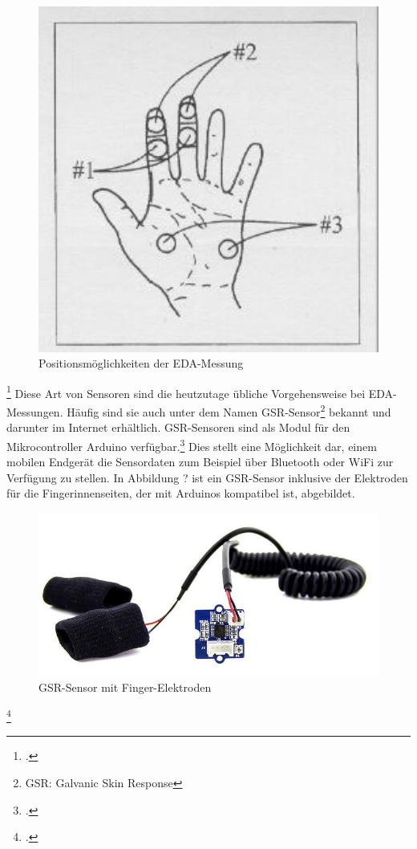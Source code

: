 \begin{figure}[h]
	\centering
	\includegraphics[width=12cm]{Bilder/gsr-hand.jpg}
	\caption[Positionsmöglichkeiten der EDA-Messung]{Positionsmöglichkeiten der EDA-Messung\footnotemark}
\end{figure}\footcitetext[][Folie 25]{Sch12}
\newline
Diese Art von Sensoren sind die heutzutage übliche Vorgehensweise bei EDA-Messungen. Häufig sind sie auch unter dem Namen GSR-Sensor\footnote{GSR: Galvanic Skin Response} bekannt und darunter im Internet erhältlich. GSR-Sensoren sind als Modul für den Mikrocontroller Arduino verfügbar.\footcite[beispielsweise:][]{Gro18} Dies stellt eine Möglichkeit dar, einem mobilen Endgerät die Sensordaten zum Beispiel über Bluetooth oder WiFi zur Verfügung zu stellen. In Abbildung ? ist ein GSR-Sensor inklusive der Elektroden für die Fingerinnenseiten, der mit Arduinos kompatibel ist, abgebildet.
\begin{figure}[h]
	\centering
	\includegraphics[width=15cm]{Bilder/sensor.jpg}
	\caption[GSR-Sensor mit Finger-Elektroden]{GSR-Sensor mit Finger-Elektroden\footnotemark}
\end{figure}%
\footcitetext{Gro18}
